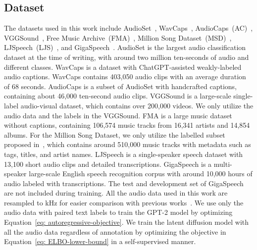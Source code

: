 \documentclass[lettersize,journal]{IEEEtran}
\begin{document}
\subsection{Dataset} 
\noindent
The datasets used in this work include AudioSet~\cite{gemmeke2017audio}, WavCaps~\cite{mei2023wavcaps}, AudioCaps~(AC)~\cite{kim2019audiocaps}, VGGSound~\cite{chen2020vggsound}, Free Music Archive~(FMA)~\cite{defferrard2016fma}, Million Song Dataset~(MSD)~\cite{bertin2011million}, LJSpeech~(LJS)~\cite{ljspeech17}, and GigaSpeech~\cite{chen2021gigaspeech}. AudioSet is the largest audio classification dataset at the time of writing, with around two million ten-seconds of audio and  different classes. 
WavCaps is a dataset with ChatGPT-assisted weakly-labeled audio captions. WavCaps contains 403,050 audio clips with an average duration of 68 seconds. AudioCaps is a subset of AudioSet with handcrafted captions, containing about 46,000 ten-second audio clips. VGGSound is a large-scale single-label audio-visual dataset, which contains over 200,000 videos. We only utilize the audio data and the labels in the VGGSound. FMA is a large music dataset without captions, containing 106,574 music tracks from 16,341 artists and 14,854 albums. For the Million Song Dataset, we only utilize the labelled subset proposed in~\cite{toward2022doh-ecals}, which contains around 510,000 music tracks with metadata such as tags, titles, and artist names. LJSpeech is a single-speaker speech dataset with 13,100 short audio clips and detailed transcriptions. 
GigaSpeech is a multi-speaker large-scale English speech recognition corpus with around 10,000 hours of audio labeled with transcriptions. The test and development set of GigaSpeech are not included during training. All the audio data used in this work are resampled to  kHz for easier comparison with previous works~\cite{liu2023audioldm, huang2023make-an-audio}. We use only the audio data with paired text labels to train the GPT-2 model by optimizing Equation~\eqref{eq: autoregressive-objective}. We train the latent diffusion model with all the audio data regardless of annotation by optimizing the objective in Equation~\eqref{eq: ELBO-lower-bound} in a self-supervised manner.
\end{document}
